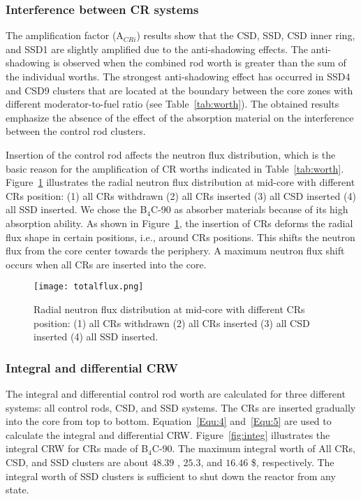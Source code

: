 \subsubsection{Interference between CR systems}

The amplification factor (A$_{CRi}$) results show that the CSD, SSD, CSD inner ring, and SSD1 are slightly amplified due to the anti-shadowing effects. The anti-shadowing is observed when the combined rod worth is greater than the sum of the individual worths. The strongest anti-shadowing effect has occurred in SSD4 and CSD9 clusters that are located at the boundary between the core zones with different moderator-to-fuel ratio (see Table~\ref{tab:worth}).
The obtained results emphasize the absence of the effect of the absorption material on the interference between the control rod clusters.

Insertion of the control rod affects the neutron flux distribution, which is the basic reason for the amplification of CR worths indicated in Table~\ref{tab:worth}. Figure~\ref{fig:totalflux} illustrates the radial neutron flux distribution at mid-core with different CRs position: (1) all CRs withdrawn (2) all CRs inserted (3) all CSD inserted (4) all SSD inserted. We chose the B$_4$C-90 as absorber materials because of its high absorption ability. As shown in Figure~\ref{fig:totalflux}, the insertion of CRs deforms the radial flux shape in certain positions, i.e., around CRs positions. This shifts the neutron flux from the core center towards the periphery. A maximum neutron flux shift occurs when all CRs are inserted into the core.

\begin{figure}
	\centering
	\texttt{[image: totalflux.png]}
	\vspace{-0.5in}
	\caption{Radial neutron flux distribution at mid-core with different CRs position: (1) all CRs withdrawn (2) all CRs inserted (3) all CSD inserted (4) all SSD inserted.} 
	\label{fig:totalflux}
\end{figure}
 

\subsubsection{Integral and differential CRW}

The integral and differential control rod worth are calculated for three different systems: all control rods, CSD, and SSD systems. The CRs are inserted gradually into the core from top to bottom. Equation~\ref{Equ:4} and~\ref{Equ:5} are used to calculate the integral and differential CRW. Figure~\ref{fig:integ} illustrates the integral CRW for CRs made of B$_4$C-90. The maximum integral worth of All CRs, CSD, and SSD clusters are about $48.39$ , $25.3$, and $16.46$ \$, respectively. The integral worth of SSD clusters is sufficient to shut down the reactor from any state.

